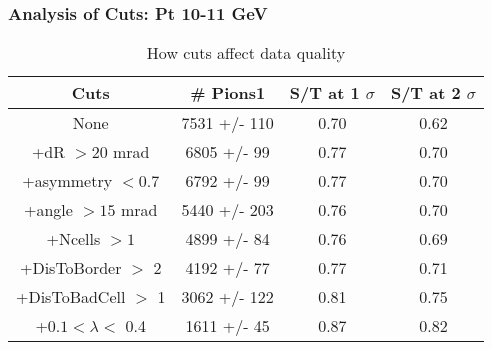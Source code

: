 \frame
{
\frametitle{Analysis of Cuts: Pt 10-11 GeV}
\begin{table}
\caption{How cuts affect data quality}
\centering
\begin{tabular}{c c c c}
\hline\hline
Cuts & \# Pions1 & S/T at 1 $\sigma$ & S/T at 2 $\sigma$ \\ [0.5ex]
\hline
None & 7531 +/-  110 & 0.70 & 0.62 \\ %
+dR $> 20$ mrad & 6805 +/-   99 & 0.77 & 0.70 \\ %
+asymmetry $< 0.7$ & 6792 +/-   99 & 0.77 & 0.70 \\ %
+angle $> 15$ mrad & 5440 +/-  203 & 0.76 & 0.70 \\ %
+Ncells $> 1$& 4899 +/-   84 & 0.76 & 0.69 \\ %
+DisToBorder $>$ 2 & 4192 +/-   77 & 0.77 & 0.71 \\ %
+DisToBadCell $>$ 1& 3062 +/-  122 & 0.81 & 0.75 \\ %
+$0.1 < \lambda <$ 0.4 & 1611 +/-   45 & 0.87 & 0.82 \\ %
[1ex]
\hline
\end{tabular}
\label{table:nonlin}
\end{table}
}
